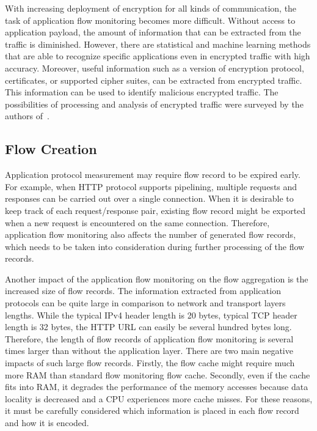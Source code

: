 With increasing deployment of encryption for all kinds of communication, the task of application flow monitoring becomes more difficult. Without access to application payload, the amount of information that can be extracted from the traffic is diminished. However, there are statistical and machine learning methods that are able to recognize specific applications even in encrypted traffic with high accuracy. Moreover, useful information such as a version of encryption protocol, certificates, or supported cipher suites, can be extracted from encrypted traffic. This information can be used to identify malicious encrypted traffic. The possibilities of processing and analysis of encrypted traffic were surveyed by the authors of~\cite{Velan-2015-Survey}.

\subsection{Flow Creation}

Application protocol measurement may require flow record to be expired early. For example, when HTTP protocol supports pipelining, multiple requests and responses can be carried out over a single connection. When it is desirable to keep track of each request/response pair, existing flow record might be exported when a new request is encountered on the same connection. Therefore, application flow monitoring  also affects the number of generated flow records, which needs to be taken into consideration during further processing of the flow records.


Another impact of the application flow monitoring on the flow aggregation is the increased size of flow records. The information extracted from application protocols can be quite large in comparison to network and transport layers lengths. While the typical IPv4 header length is 20 bytes, typical TCP header length is 32 bytes, the HTTP URL can easily be several hundred bytes long. Therefore, the length of flow records of application flow monitoring is several times larger than without the application layer. There are two main negative impacts of such large flow records. Firstly, the flow cache might require much more RAM than standard flow monitoring flow cache. Secondly, even if the cache fits into RAM, it degrades the performance of the memory accesses because data locality is decreased and a CPU experiences more cache misses. For these reasons, it must be carefully considered which information is placed in each flow record and how it is encoded.

